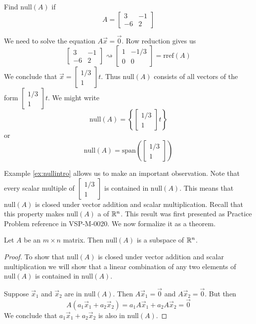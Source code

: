 \documentclass{ximera}
\begin{document}
\begin{example}\label{ex:nullintro}Find $\mbox{null}(A)$ if
$$A=\begin{bmatrix}3&-1\\-6&2\end{bmatrix}$$
\begin{explanation}We need to solve the equation $A\vec{x}=\vec{0}$.  Row reduction gives us
$$\begin{bmatrix}3&-1\\-6&2\end{bmatrix}\rightsquigarrow\begin{bmatrix}1&-1/3\\0&0\end{bmatrix}=\mbox{rref}(A)$$
We conclude that $\vec{x}=\begin{bmatrix}1/3\\1\end{bmatrix}t$.  Thus $\mbox{null}(A)$ consists of all vectors of the form $\begin{bmatrix}1/3\\1\end{bmatrix}t$.  We might write
$$\mbox{null}(A)=\left\{\begin{bmatrix}1/3\\1\end{bmatrix}t\right\}$$ or
$$\mbox{null}(A)=\mbox{span}\left(\begin{bmatrix}1/3\\1\end{bmatrix}\right)$$
\end{explanation}
\end{example}
Example \ref{ex:nullintro} allows us to make an important observation. Note that every scalar multiple of $\begin{bmatrix}1/3\\1\end{bmatrix}$ is contained in $\mbox{null}(A)$.  This means that $\mbox{null}(A)$ is closed under vector addition and scalar multiplication.  Recall that this property makes $\mbox{null}(A)$ a  of $\mathbb{R}^n$.  This result was first presented as Practice Problem {\color{red}reference} in VSP-M-0020. We now formalize it as a theorem.

\begin{theorem} Let $A$ be an $m\times n$ matrix.  Then $\mbox{null}(A)$ is a subspace of $\mathbb{R}^n$.
\end{theorem}
\begin{proof}To show that $\mbox{null}(A)$ is closed under vector addition and scalar multiplication we will show that a linear combination of any two elements of $\mbox{null}(A)$ is contained in $\mbox{null}(A)$.

Suppose $\vec{x}_1$ and $\vec{x}_2$ are in $\mbox{null}(A)$.  Then $A\vec{x}_1=\vec{0}$ and $A\vec{x}_2=\vec{0}$.  But then
$$A(a_1\vec{x}_1+a_2\vec{x}_2)=a_1A\vec{x}_1+a_2A\vec{x}_2=\vec{0}$$
We conclude that $a_1\vec{x}_1+a_2\vec{x}_2$ is also in $\mbox{null}(A)$.
\end{proof}
\end{document}
